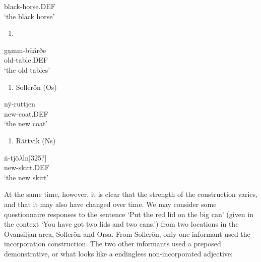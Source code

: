 black-horse.DEF\\ %


‘the black horse’
\z


\begin{enumerate} %
\item 
\end{enumerate} %
\ea\label{}
\gll gąmm-b\=uärðe\\


old-table.DEF\\ %


‘the old tables’
\z


\begin{enumerate} %
\item 
Sollerön (Os)

\end{enumerate} %
\ea\label{}
\gll n\={y}-ruttjen\\


new-coat.DEF\\ %


‘the new coat’
\z


\begin{enumerate} %
\item 
\label{bkm:Ref140983982}Rättvik (Ns)

\end{enumerate} %
\ea\label{}
\gll n\=\ir-tj\u{o}$\lambda $ln[325?]\\


new-skirt.DEF\\ %


‘the new skirt’
\z


At the same time, however, it is clear that the strength of the construction varies, and that it may also have changed over time. We may consider some questionnaire responses to the sentence ‘Put the red lid on the big can’ (given in the context ‘You have got two lids and two cans.’) from two locations in the Ovansiljan area, Sollerön and Orsa. From Sollerön, only one informant used the incorporation construction. The two other informants used a preposed demonstrative, or what looks like a endingless non-incorporated adjective: 

